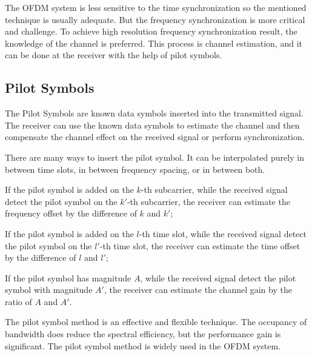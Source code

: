 The OFDM system is less sensitive to the time synchronization so the mentioned technique is usually adequate. But the frequency synchronization is more critical and challenge. To achieve high resolution frequency synchronization result, the knowledge of the channel is preferred. This process is channel estimation, and it can be done at the receiver with the help of pilot symbols.

\subsection{Pilot Symbols}
The Pilot Symbols are known data symbols inserted into the transmitted signal. The receiver can use the known data symbols to estimate the channel and then compensate the channel effect on the received signal or perform synchronization.

There are many ways to insert the pilot symbol. It can be interpolated purely in between time slots, in between frequency spacing, or in between both.
\begin{enumerate*}[(i)]
    \item If the pilot symbol is added on the $k$-th subcarrier, while the received signal detect the pilot symbol on the $k'$-th subcarrier, the receiver can estimate the frequency offset by the difference of $k$ and $k'$;
    \item If the pilot symbol is added on the $l$-th time slot, while the received signal detect the pilot symbol on the $l'$-th time slot, the receiver can estimate the time offset by the difference of $l$ and $l'$;
    \item If the pilot symbol has magnitude $A$, while the received signal detect the pilot symbol with magnitude $A'$, the receiver can estimate the channel gain by the ratio of $A$ and $A'$.
\end{enumerate*}
The pilot symbol method is an effective and flexible technique. The occupancy of bandwidth does reduce the spectral efficiency, but the performance gain is significant. The pilot symbol method is widely used in the OFDM system.